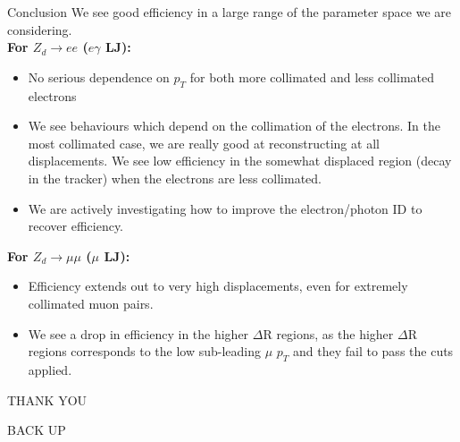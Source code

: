 \documentclass{beamer}
\begin{document}
\begin{frame}{Conclusion}
 We see good efficiency in a large range of the parameter space we are considering.\\
\textbf{For $Z_d \rightarrow ee$ ($e\gamma$ LJ):}\\
\begin{itemize}
\item No serious dependence on $p_T$ for both more collimated and less collimated electrons
\item We see behaviours which depend on the collimation of the electrons. In the most collimated case, we are really good at reconstructing at all displacements. We see low efficiency in the somewhat displaced region (decay in the tracker) when the electrons are less collimated. 
\item We are actively investigating how to improve the electron/photon ID to recover efficiency.

\end{itemize}
\textbf{For $Z_d\rightarrow \mu\mu$ ($\mu$ LJ):}\\
\begin{itemize}
\item Efficiency extends out to very high displacements, even for extremely collimated muon pairs. 
\item We see a drop in efficiency in the higher $\Delta$R regions, as the higher $\Delta$R regions corresponds to the low sub-leading $\mu$ $p_T$ and they fail to pass the cuts applied.
\end{itemize}
\end{frame}
\begin{frame}{}
\centering
\Huge
THANK YOU
\end{frame}
\begin{frame}[noframenumbering]{}
\centering
\Huge
BACK UP
\end{frame}
\end{document}
